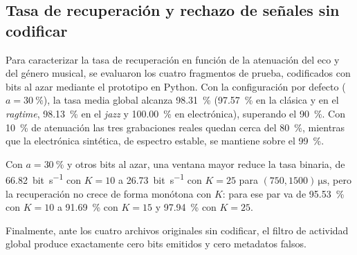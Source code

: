 \subsection{Tasa de recuperación y rechazo de señales sin codificar}
\label{sec:recuperacion}

Para caracterizar la tasa de recuperación en función de la atenuación del eco y del género musical, se evaluaron los cuatro fragmentos de prueba, codificados con bits al azar mediante el prototipo en Python. Con la configuración por defecto ($a = \SI{30}{\percent}$), la tasa media global alcanza \SI{98.31}{\percent} (\SI{97.57}{\percent} en la clásica y en el \textit{ragtime}, \SI{98.13}{\percent} en el \textit{jazz} y \SI{100.00}{\percent} en electrónica), superando el \SI{90}{\percent}. Con \SI{10}{\percent} de atenuación las tres grabaciones reales quedan cerca del \SI{80}{\percent}, mientras que la electrónica sintética, de espectro estable, se mantiene sobre el \SI{99}{\percent}.


Con $a = \SI{30}{\percent}$ y otros bits al azar, una ventana mayor reduce la tasa binaria, de \SI{66.82}{bit\per\second} con $K=10$ a \SI{26.73}{bit\per\second} con $K=25$ para $(750, 1500)\,\si{\micro\second}$, pero la recuperación no crece de forma monótona con $K$: para ese par va de \SI{95.53}{\percent} con $K=10$ a \SI{91.69}{\percent} con $K=15$ y \SI{97.94}{\percent} con $K=25$. 


Finalmente, ante los cuatro archivos originales sin codificar, el filtro de actividad global produce exactamente cero bits emitidos y cero metadatos falsos.


